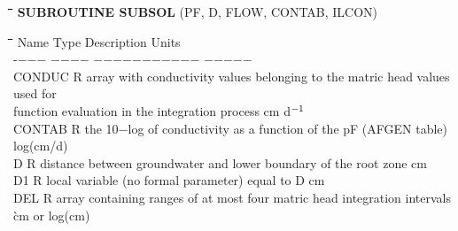 \documentclass[11pt]{article}
\begin{document}
\nwln
\begin{tabbing}
\hspace{1.27cm}\=\hspace{1.27cm}\=\hspace{1.27cm}\=\hspace{1.27cm}\=%
\hspace{1.27cm}\=\hspace{1.27cm}\=\hspace{1.27cm}\=\hspace{1.27cm}\=%
\hspace{1.27cm}\=\hspace{1.27cm}\=\kill
{\bf SUBROUTINE SUBSOL} \> \> \> (PF, D, FLOW, CONTAB, ILCON)
\end{tabbing}
\nwln
\begin{tabbing}
\hspace{1.27cm}\=\hspace{1.27cm}\=\hspace{1.27cm}\=\hspace{1.27cm}\=%
\hspace{1.27cm}\=\hspace{1.27cm}\=\hspace{1.27cm}\=\hspace{1.27cm}\=%
\hspace{1.27cm}\=\hspace{1.27cm}\=\kill
Name    \> \> Type   \> Description                                        \> \> \> \> \> \> \> Units\\
-$-$$-$$-$    \> \> $-$$-$$-$$-$   \> $-$$-$$-$$-$$-$$-$$-$$-$$-$$-$$-$                                       \> \> \> \> \> \> \>  $-$$-$$-$$-$$-$\\
CONDUC  \> \> R   \> array with conductivity values belonging to the matric head values used for \\
\>\> \> function evaluation in the integration process              \> \> \> \> \> \> \> cm d$^{{\rm -1}}$\\
CONTAB  \> \> R   \> the 10$-$log of conductivity as a function of the pF (AFGEN table)    \> \> \> \> \> \> \> log(cm/d)\\
D       \> \> R   \> distance between groundwater and lower boundary of the root zone      \> \> \> \> \> \> \> cm\\
D1      \> \> R   \> local variable (no formal parameter) equal to D    \> \> \> \> \> \> \> cm\\
DEL     \> \> R   \> array containing ranges of at most four matric head integration intervals \`cm or log(cm)\\
$$
\end{tabbing}
\end{document}
